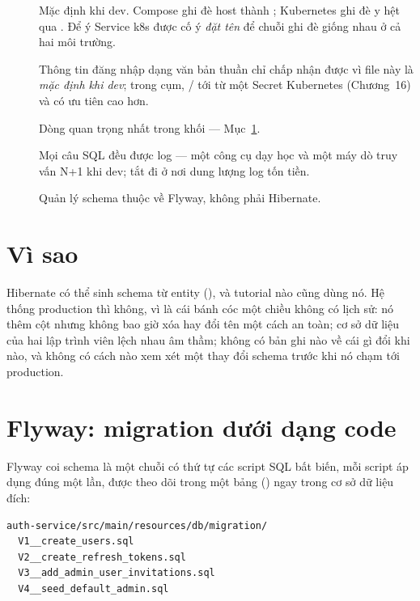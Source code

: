 \begin{description}
  \item[] Mặc định khi dev. Compose ghi đè host thành
  ; Kubernetes ghi đè y hệt qua
  . Để ý Service k8s được cố ý \emph{đặt
  tên}  để chuỗi ghi đè giống nhau ở cả hai môi
  trường.
  \item[] Thông tin đăng nhập dạng văn bản thuần chỉ chấp nhận
  được vì file này là \emph{mặc định khi dev}; trong cụm,
  / tới từ một Secret
  Kubernetes (Chương~16) và có ưu tiên cao hơn.
  \item[] Dòng quan trọng nhất trong khối ---
  Mục~\ref{sec:ddlauto}.
  \item[] Mọi câu SQL đều được log --- một công cụ dạy học và một
  máy dò truy vấn N+1 khi dev; tắt đi ở nơi dung lượng log tốn tiền.
  \item[] Quản lý schema thuộc về Flyway, không phải Hibernate.
\end{description}

\section{Vì sao }
\label{sec:ddlauto}

Hibernate có thể sinh schema từ entity (), và
tutorial nào cũng dùng nó. Hệ thống production thì không, vì
 là cái bánh cóc một chiều không có lịch sử: nó thêm cột
nhưng không bao giờ xóa hay đổi tên một cách an toàn; cơ sở dữ liệu của
hai lập trình viên lệch nhau âm thầm; không có bản ghi nào về cái gì đổi
khi nào, và không có cách nào xem xét một thay đổi schema trước khi nó
chạm tới production.

\section{Flyway: migration dưới dạng code}

Flyway coi schema là một chuỗi có thứ tự các script SQL bất biến, mỗi
script áp dụng đúng một lần, được theo dõi trong một bảng
() ngay trong cơ sở dữ liệu đích:

\begin{lstlisting}
auth-service/src/main/resources/db/migration/
  V1__create_users.sql
  V2__create_refresh_tokens.sql
  V3__add_admin_user_invitations.sql
  V4__seed_default_admin.sql
\end{lstlisting}

